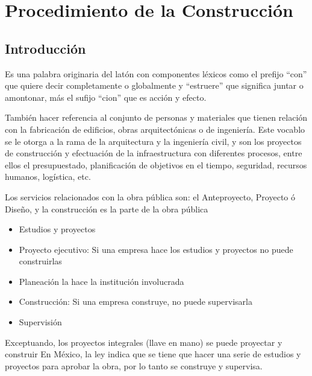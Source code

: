 \chapter{Procedimiento de la Construcción}



\section{Introducción}
\begin{definition}[Construcción]
    Es una palabra originaria del latón con componentes léxicos como el prefijo ``con'' que quiere decir completamente o globalmente y ``estruere'' que significa juntar o amontonar, más el sufijo ``cion'' que es acción y efecto.

    También hacer referencia al conjunto de personas y materiales que tienen relación con la fabricación de edificios, obras arquitectónicas o de ingeniería. Este vocablo se le otorga a la rama de la arquitectura y la ingeniería civil, y son los proyectos de construcción y efectuación de la infraestructura con diferentes procesos, entre ellos el presupuestado, planificación de objetivos en el tiempo, seguridad, recursos humanos, logística, etc.
\end{definition}
Los servicios relacionados con la obra pública son: el Anteproyecto, Proyecto ó Diseño, y la construcción es la parte de la obra pública
\begin{itemize}
    \item Estudios y proyectos
    \item Proyecto ejecutivo: Si una empresa hace los estudios y proyectos no puede construirlas
    \item Planeación la hace la institución involucrada
    \item Construcción: Si una empresa construye, no puede supervisarla
    \item Supervisión
\end{itemize}
Exceptuando, los proyectos integrales (llave en mano) se puede proyectar y construir
En México, la ley indica que se tiene que hacer una serie de estudios y proyectos para aprobar la obra, por lo tanto se construye y supervisa.

